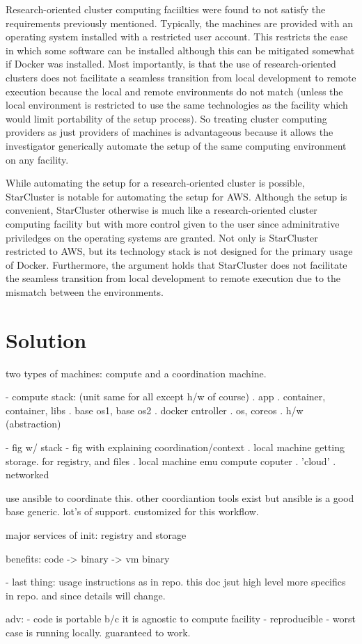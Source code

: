 Research-oriented cluster computing faciilties were found to not satisfy the requirements previously mentioned.
%
Typically, the machines are provided with an operating system installed with a restricted user account.
%
This restricts the ease in which some software can be installed although this can be mitigated somewhat if \textsf{Docker} was installed.
%
Most importantly, is that the use of research-oriented clusters does not facilitate a seamless transition from local development to remote execution because the local and remote environments do not match (unless the local environment is restricted to use the same technologies as the facility which would limit portability of the setup process).
%
So treating cluster computing providers as just providers of machines is advantageous because it allows the investigator generically automate the setup of the same computing environment on any facility.


While automating the setup for a research-oriented cluster is possible, \textsf{StarCluster} is notable for automating the setup for \textsf{AWS}.
%
Although the setup is convenient, \textsf{StarCluster} otherwise is much like a research-oriented cluster computing facility but with more control given to the user since adminitrative priviledges on the operating systems are granted.
%
Not only is \textsf{StarCluster} restricted to \textsf{AWS}, but its technology stack is not designed for the primary usage of \textsf{Docker}.
%
Furthermore, the argument holds that \textsf{StarCluster} does not facilitate the seamless transition from local development to remote execution due to the mismatch between the environments.



\section{Solution}


two types of machines: compute and a coordination machine.

- compute stack: (unit same for all except h/w of course)
. app
. container, container, libs
. base os1, base os2
. docker cntroller
. os, coreos
. h/w (abstraction)



- fig w/ stack
- fig with explaining coordination/context
. local machine getting storage. for registry, and files
. local machine emu compute coputer
. 'cloud'
. networked 

use ansible to coordinate this. other coordiantion tools exist but ansible is a good base generic. lot's of support. customized for this workflow.


major services of init: registry and storage

benefits:
code -> binary -> vm binary

- last thing: usage instructions as in repo. this doc jsut high level more specifics in repo. and since details will change.

adv:
- code is portable b/c it is agnostic to compute facility
- reproducible
- worst case is running locally. guaranteed to work.


